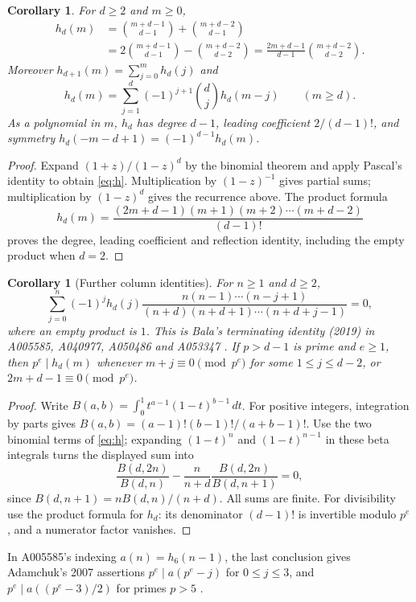 \documentclass[11pt]{article}
\newtheorem{corollary}[theorem]{Corollary}
\begin{document}
\begin{corollary}\label{cor:family}
For $d\geq2$ and $m\geq0$,
\begin{align}
h_d(m)&=\binom{m+d-1}{d-1}+\binom{m+d-2}{d-1}\label{eq:h}\\
&=2\binom{m+d-1}{d-1}-\binom{m+d-2}{d-2}
=\frac{2m+d-1}{d-1}\binom{m+d-2}{d-2}.\nonumber
\end{align}
Moreover $h_{d+1}(m)=\sum_{j=0}^m h_d(j)$ and
\[
h_d(m)=\sum_{j=1}^d(-1)^{j+1}\binom dj h_d(m-j)\qquad(m\geq d).
\]
As a polynomial in $m$, $h_d$ has degree $d-1$, leading coefficient
$2/(d-1)!$, and symmetry $h_d(-m-d+1)=(-1)^{d-1}h_d(m)$.
\end{corollary}
\begin{proof}
Expand $(1+z)/(1-z)^d$ by the binomial theorem and apply Pascal's identity
to obtain \eqref{eq:h}. Multiplication by $(1-z)^{-1}$ gives partial sums;
multiplication by $(1-z)^d$ gives the recurrence above.
The product formula
\[
h_d(m)=\frac{(2m+d-1)(m+1)(m+2)\cdots(m+d-2)}{(d-1)!}
\]
proves the degree, leading coefficient and reflection identity, including
the empty product when $d=2$.
\end{proof}

\begin{corollary}[Further column identities]\label{cor:column-siblings}
For $n\geq1$ and $d\geq2$,
\[
\sum_{j=0}^n(-1)^j h_d(j)
\frac{n(n-1)\cdots(n-j+1)}{(n+d)(n+d+1)\cdots(n+d+j-1)}=0,
\]
where an empty product is $1$. This is Bala's terminating identity (2019)
in A005585, A040977, A050486 and A053347 \cite{columns}.
If $p>d-1$ is prime and $e\geq1$, then $p^e\mid h_d(m)$ whenever
$m+j\equiv0\pmod{p^e}$ for some $1\leq j\leq d-2$, or
$2m+d-1\equiv0\pmod{p^e}$.
\end{corollary}
\begin{proof}
Write $B(a,b)=\int_0^1t^{a-1}(1-t)^{b-1}\,dt$.
For positive integers, integration by parts gives
$B(a,b)=(a-1)!(b-1)!/(a+b-1)!$.
Use the two binomial terms of \eqref{eq:h}; expanding $(1-t)^n$ and
$(1-t)^{n-1}$ in these beta integrals turns the displayed sum into
\[
\frac{B(d,2n)}{B(d,n)}-
\frac{n}{n+d}\frac{B(d,2n)}{B(d,n+1)}=0,
\]
since $B(d,n+1)=nB(d,n)/(n+d)$. All sums are finite.
For divisibility use the product formula for $h_d$: its denominator
$(d-1)!$ is invertible modulo $p^e$, and a numerator factor vanishes.
\end{proof}
In A005585's indexing $a(n)=h_6(n-1)$, the last conclusion gives Adamchuk's
2007 assertions $p^e\mid a(p^e-j)$ for $0\leq j\leq3$, and
$p^e\mid a((p^e-3)/2)$ for primes $p>5$ \cite{columns}.
\end{document}
